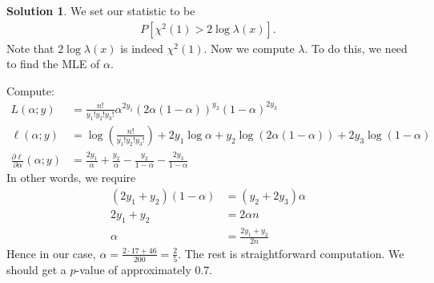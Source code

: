 \documentclass[11pt]{amsart}
\theoremstyle{definition}
\newtheorem{solution}[theorem]{Solution}
\numberwithin{equation}{section}
\begin{document}
\begin{solution}
    We set our statistic to be
    \begin{align*}
        P[\chi^2(1)>2\log\lambda(x)].
    \end{align*}
    Note that $2\log\lambda(x)$ is indeed $\chi^2(1)$. Now we compute $\lambda$. To do this, we need to find the MLE of $\alpha$.

    Compute: 
    \begin{align*}
        L(\alpha;y)&=\frac{n!}{y_1!y_2!y_3!}\alpha^{2y_1}(2\alpha(1-\alpha))^{y_2}(1-\alpha)^{2y_3}\\
        \ell(\alpha;y)&=\log(\frac{n!}{y_1!y_2!y_3!})+2y_1\log\alpha+y_2\log(2\alpha(1-\alpha))+2y_3\log(1-\alpha)\\
        \frac{\partial\ell}{\partial\alpha}(\alpha;y)&=\frac{2y_1}{\alpha}+\frac{y_2}{\alpha}-\frac{y_2}{1-\alpha}-\frac{2y_3}{1-\alpha}
    \end{align*}
    In other words, we require
    \begin{align*}
        (2y_1+y_2)(1-\alpha)&=(y_2+2y_3)\alpha\\
        2y_1+y_2&=2\alpha n\\
        \alpha&=\frac{2y_1+y_2}{2n}
    \end{align*}
    Hence in our case, $\alpha=\frac{2\cdot17+46}{200}=\frac{2}{5}$. The rest is straightforward computation. We should get a $p$-value of approximately 0.7.
\end{solution}
\end{document}
